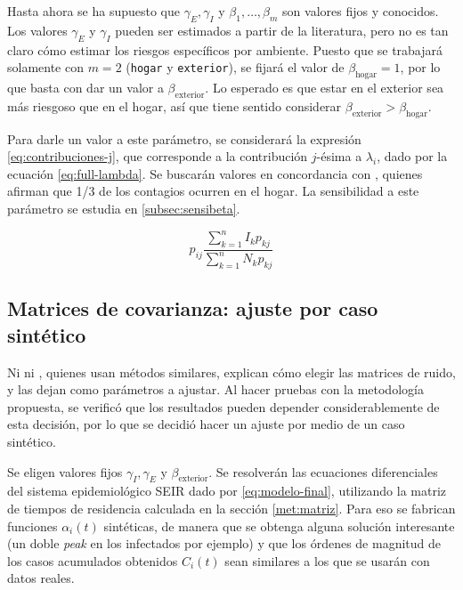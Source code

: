 Hasta ahora se ha supuesto que \(\gamma_E, \gamma_I\) y \(\beta_1, \dots, \beta_m\) son valores fijos y conocidos. Los valores \(\gamma_E\) y \(\gamma_I\) pueden ser estimados a partir de la literatura, pero no es tan claro cómo estimar los riesgos específicos por ambiente. Puesto que se trabajará solamente con \(m= 2\) (\texttt{hogar} y \texttt{exterior}), se fijará el valor de \(\beta_{\text{hogar}} = 1\), por lo que basta con dar un valor a \(\beta_{\text{exterior}}\). Lo esperado es que estar en el exterior sea más riesgoso que en el hogar, así que tiene sentido considerar \(\beta_{\text{exterior}} > \beta_{\text{hogar}}\). 

Para darle un valor a este parámetro, se considerará la expresión \ref{eq:contribuciones-j}, que corresponde a la contribución \(j\)-ésima a \(\lambda_i\), dado por la ecuación \ref{eq:full-lambda}. Se buscarán valores en concordancia con \cite{Ferguson2020}\cite{Mossong2008}, quienes afirman que 1/3 de los contagios ocurren en el hogar. La sensibilidad a este parámetro se estudia en \ref{subsec:sensibeta}.

\begin{equation}\label{eq:contribuciones-j}
 p_{ij} \frac{\sum_{k = 1}^n I_{k} p_{kj}}{\sum_{k = 1}^n N_{k} p_{kj}}
\end{equation}




\subsection{Matrices de covarianza: ajuste por caso sintético}\label{met-subsec:sintetico}

Ni \cite{Hasan2020} ni \cite{Sameni2020}, quienes usan métodos similares, explican cómo elegir las matrices de ruido, y las dejan como parámetros a ajustar. Al hacer pruebas con la metodología propuesta, se verificó que los resultados pueden depender considerablemente de esta decisión, por lo que se decidió hacer un ajuste por medio de un caso sintético.


Se eligen valores fijos \(\gamma_I, \gamma_E\) y \(\beta_{\text{exterior}}\). Se resolverán las ecuaciones diferenciales del sistema epidemiológico SEIR dado por \ref{eq:modelo-final}, utilizando la matriz de tiempos de residencia calculada en la sección \ref{met:matriz}. Para eso se fabrican funciones \(\alpha_i(t)\) sintéticas, de manera que se obtenga alguna solución interesante (un doble \textit{peak} en los infectados por ejemplo) y que los órdenes de magnitud de los casos acumulados obtenidos \(C_i(t)\) sean similares a los que se usarán con datos reales.

